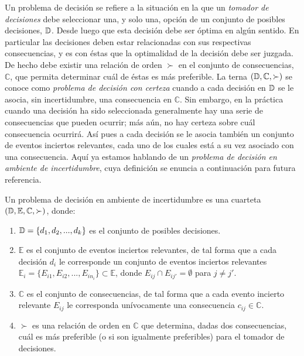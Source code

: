 Un problema de decisión se refiere a la situación en la que un \textit{tomador de decisiones} debe seleccionar una, y solo una, opción de un conjunto de posibles decisiones, $\mathbb{D}$. Desde luego que esta decisión debe ser óptima en algún sentido. En particular las decisiones deben estar relacionadas con sus respectivas consecuencias, y es con éstas que la optimalidad de la decisión debe ser juzgada. De hecho debe existir una relación de orden $\succ$ en el conjunto de consecuencias, $\mathbb{C}$, que permita determinar cuál de éstas es más preferible. La terna $( \mathbb{D}, \mathbb{C}, \succ )$ se conoce como \textit{problema de decisión con certeza} cuando a cada decisión en $\mathbb{D}$ se le asocia, sin incertidumbre, una consecuencia en $\mathbb{C}$. Sin embargo, en la práctica cuando una decisión ha sido seleccionada generalmente hay una serie de consecuencias que pueden ocurrir; más aún, no hay certeza sobre cuál consecuencia ocurrirá. Así pues a cada decisión se le asocia también un conjunto de eventos inciertos relevantes, cada uno de los cuales está a su vez asociado con una consecuencia. Aquí ya estamos hablando de un \textit{problema de decisión en ambiente de incertidumbre}, cuya definición se enuncia a continuación para futura referencia. \\

\begin{definition} \label{def:decision_problem}
Un problema de decisión en ambiente de incertidumbre es una cuarteta $( \mathbb{D}, \mathbb{E}, \mathbb{C}, \succ )$, donde:
\begin{enumerate}
\item $\mathbb{D} = \{ d_1, d_2, ..., d_k \}$ es el conjunto de posibles decisiones.
\item $\mathbb{E}$ es el conjunto de eventos inciertos relevantes, de tal forma que a cada decisión $d_i$ le corresponde un conjunto de eventos inciertos relevantes
$\mathbb{E}_i = \{E_{i1}, E_{i2}, ..., E_{i n_i} \} \subset \mathbb{E}$, donde $E_{ij} \cap E_{ij'} = \emptyset$ para $j \neq j'$.
\item $\mathbb{C}$ es el conjunto de consecuencias, de tal forma que a cada evento incierto relevante $E_{ij}$ le corresponda unívocamente una consecuencia $c_{ij} \in \mathbb{C}$.
\item $\succ$ es una relación de orden en $\mathbb{C}$ que determina, dadas dos consecuencias, cuál es más preferible (o si son igualmente preferibles) para el tomador de decisiones.
\end{enumerate}
\end{definition}

